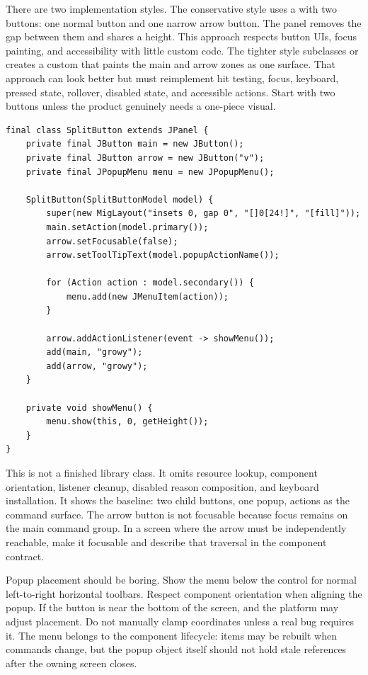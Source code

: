 There are two implementation styles. The conservative style uses a
 with two buttons: one normal button and one narrow arrow button.
The panel removes the gap between them and shares a height. This approach respects
button UIs, focus painting, and accessibility with little custom code. The tighter style
subclasses
 or creates a custom
 that paints the main and arrow zones as one surface. That
approach can look better but must reimplement hit testing, focus, keyboard, pressed
state, rollover, disabled state, and accessible actions. Start with two buttons unless
the product genuinely needs a one-piece visual.

\begin{lstlisting}[caption={A conservative split button assembled from two buttons.}]
final class SplitButton extends JPanel {
    private final JButton main = new JButton();
    private final JButton arrow = new JButton("v");
    private final JPopupMenu menu = new JPopupMenu();

    SplitButton(SplitButtonModel model) {
        super(new MigLayout("insets 0, gap 0", "[]0[24!]", "[fill]"));
        main.setAction(model.primary());
        arrow.setFocusable(false);
        arrow.setToolTipText(model.popupActionName());

        for (Action action : model.secondary()) {
            menu.add(new JMenuItem(action));
        }

        arrow.addActionListener(event -> showMenu());
        add(main, "growy");
        add(arrow, "growy");
    }

    private void showMenu() {
        menu.show(this, 0, getHeight());
    }
}
\end{lstlisting}

This is not a finished library class. It omits resource lookup, component orientation,
listener cleanup, disabled reason composition, and keyboard installation. It shows the
baseline: two child buttons, one popup, actions as the command surface. The arrow button
is not focusable because focus remains on the main command group. In a screen where the
arrow must be independently reachable, make it focusable and describe that traversal in
the component contract.

Popup placement should be boring. Show the menu below the control for normal
left-to-right horizontal toolbars. Respect component orientation when aligning the
popup. If the button is near the bottom of the screen,  and the platform
may adjust placement. Do not manually clamp coordinates unless a real bug requires it.
The menu belongs to the component lifecycle: items may be rebuilt when commands change,
but the popup object itself should not hold stale references after the owning screen
closes.

